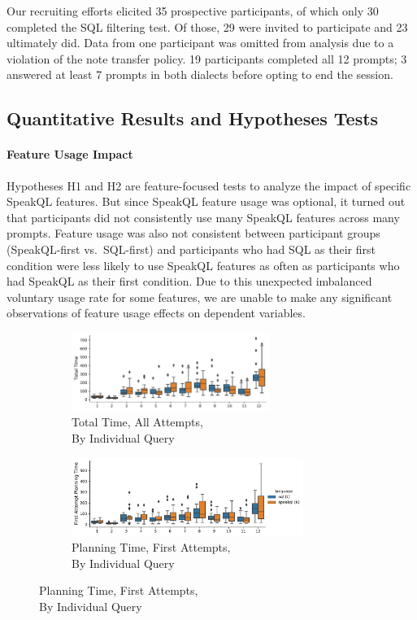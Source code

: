 Our recruiting efforts elicited 35 prospective participants, of which only 30 completed the SQL filtering test.
Of those, 29 were invited to participate and 23 ultimately did. 
Data from one participant was omitted from analysis due to a violation of the note transfer policy. 
19 participants completed all 12 prompts; 3 answered at least 7 prompts in both dialects before opting to end the session.




\subsection{Quantitative Results and Hypotheses Tests}




\paragraph{\textbf{Feature Usage Impact}} 
Hypotheses H1 and H2 are feature-focused tests to analyze the impact of specific SpeakQL features. 
But since SpeakQL feature usage was optional, it turned out that participants did not consistently use many SpeakQL features across many prompts. 
Feature usage was also not consistent between participant groups (SpeakQL-first vs.~SQL-first) and participants who had SQL as their first condition were less likely to use SpeakQL features as often as participants who had SpeakQL as their first condition. 
Due to this unexpected imbalanced voluntary usage rate for some features, we are unable to make any significant observations of feature usage effects on dependent variables. 

\begin{figure}[t]
  \centering
  \begin{subfigure}{.4\textwidth}
    \centering
    \includegraphics[height=1.0in]{figures/query-total-time-boxplot.pdf}
    \caption{Total Time, All Attempts,\\By Individual Query}
    \label{fig:querytotaltime}
  \end{subfigure}
  \begin{subfigure}{.5\textwidth}
    \centering
    \includegraphics[height=1.0in]{figures/query-planning-time-boxplot.pdf}
    \caption{Planning Time, First Attempts,\\By Individual Query}
    \label{fig:queryplanningtime}
  \end{subfigure}
\end{figure}

